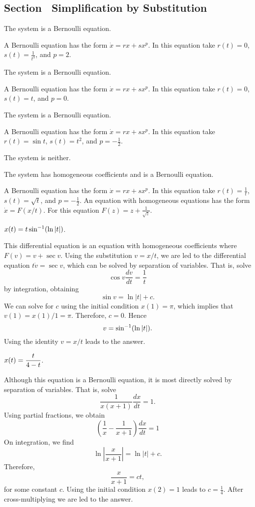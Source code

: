 \documentclass{ximera}
\begin{document}
\newpage
\subsection*{Section~\protect{\ref{sec:SBS}} Simplification by Substitution}

 \ans The system is a Bernoulli equation.

\soln A Bernoulli equation has the form $\dot{x}=rx+sx^p$.  In this equation
take $r(t)=0$, $s(t)= \frac{1}{t^3}$, and $p=2$.

 \ans The system is a Bernoulli equation.

\soln A Bernoulli equation has the form $\dot{x}=rx+sx^p$.  In this equation
take $r(t)=0$, $s(t)=t$, and $p=0$.

 \ans The system is a Bernoulli equation.

\soln A Bernoulli equation has the form $\dot{x}=rx+sx^p$.  In this equation
take $r(t)=\sin t$, $s(t)=t^2$, and $p=-\frac{1}{2}$.

 \ans The system is neither.

 \ans The system has homogeneous coefficients and is a
Bernoulli equation.

\soln A Bernoulli equation has the form $\dot{x}=rx+sx^p$.  In this equation
take $r(t)=\frac{1}{t}$, $s(t)=\sqrt{t}$, and $p=-\frac{1}{2}$.  An equation
with homogeneous equations has the form $\dot{x}=F(x/t)$.  For this equation
$F(z) = z + \frac{1}{\sqrt{z}}$.

 \ans $x(t) = t\sin^{-1}(\ln|t|)$.

\soln  This differential equation is an equation with homogeneous
coefficients where $F(v) = v + \sec v$.  Using the substitution $v=x/t$, we
are led to the differential equation $t\dot{v}=\sec v$, which can be solved
by separation of variables.  That is, solve
\[
\cos v \frac{dv}{dt} = \frac{1}{t}
\]
by integration, obtaining
\[
\sin v = \ln|t| + c.
\]
We can solve for $c$ using the initial condition $x(1)=\pi$, which implies
that $v(1)=x(1)/1=\pi$.  Therefore, $c=0$.  Hence
\[
v = \sin^{-1}(\ln|t|).
\]
Using the identity $v=x/t$ leads to the answer. 
 

 \ans $x(t) = \displaystyle\frac{t}{4-t}$.

\soln  Although this equation is a Bernoulli equation, it is most directly
solved by separation of variables.  That is, solve
\[
\frac{1}{x(x+1)}\frac{dx}{dt} = 1.
\]
Using partial fractions, we obtain
\[
\left(\frac{1}{x}-\frac{1}{x+1}\right)\frac{dx}{dt} = 1
\]
On integration, we find
\[
\ln\left|\frac{x}{x+1}\right| = \ln|t| + c.
\]
Therefore,
\[
\frac{x}{x+1} = ct,
\]
for some constant $c$.  Using the initial condition $x(2)=1$ leads to
$c=\frac{1}{4}$.  After cross-multiplying we are led to the answer.
\end{document}
